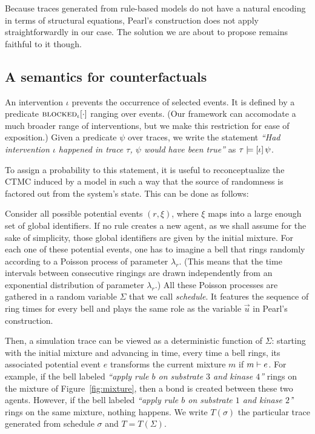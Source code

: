 Because traces generated from rule-based models do not have a natural
encoding in terms of structural equations, Pearl's construction does
not apply straightforwardly in our case. The solution we are about to
propose remains faithful to it though.


\subsection{A semantics for counterfactuals}
\label{subsec:counterfactuals-semantics}

An intervention $\iota$ prevents the occurrence of selected events. It
is defined by a predicate ${\textsc{blocked}}_{\iota}[\cdot]$ ranging over
events. (Our framework can accomodate a much broader range of
interventions, but we make this restriction for ease of exposition.)
Given a predicate $\psi$ over traces, we write the statement
\textit{``Had intervention $\iota$ happened in trace $\tau$, $\psi$
  would have been true''} as $\tau \models [\iota] \, \psi{}$.

To assign a probability to this statement, it is useful to
reconceptualize the CTMC induced by a model in such a way that the
source of randomness is factored out from the system's state. This can
be done as follows:
\begin{inparaenum}[(i)]
\item Consider all possible potential events $(r, \xi)$, where $\xi$
  maps into a large enough set of global identifiers. If no rule
  creates a new agent, as we shall assume for the sake of simplicity,
  those global identifiers are given by the initial mixture. For each
  one of these potential events, one has to imagine a bell that rings
  randomly according to a Poisson process of parameter
  $\lambda_r$. (This means that the time intervals between consecutive
  ringings are drawn independently from an exponential distribution of
  parameter $\lambda_r$.) All these Poisson processes are gathered in
  a random variable $\Sigma$ that we call \emph{schedule}. It features
  the sequence of ring times for every bell and plays the same role as
  the variable $\vec{u}$ in Pearl's construction.
\item Then, a simulation trace can be viewed as a deterministic
  function of $\Sigma$: starting with the initial mixture and
  advancing in time, every time a bell rings, its associated potential
  event $e$ transforms the current mixture $m$ if
  $m \vdash e$. For example, if the bell labeled
  \textit{``apply rule $b$ on substrate $3$ and kinase $4$''} rings on
  the mixture of Figure~\ref{fig:mixture}, then a bond is created
  between these two agents. However, if the bell labeled
  \textit{``apply rule $b$ on substrate $1$ and kinase $2$'}' rings on
  the same mixture, nothing happens. We write $T(\sigma)$ the
  particular trace generated from schedule $\sigma$ and
  $T = T(\Sigma)$.
\end{inparaenum}


